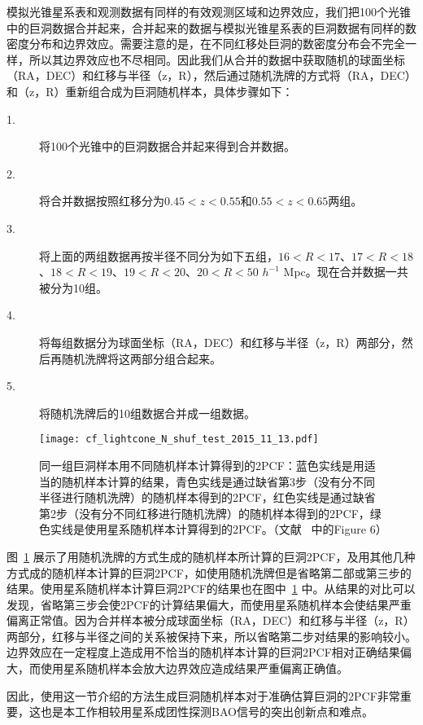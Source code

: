 {模拟光锥星系表和观测数据有同样的有效观测区域和边界效应，我们把100个光锥中的巨洞数据合并起来，合并起来的数据与模拟光锥星系表的巨洞数据有同样的数密度分布和边界效应。需要注意的是，在不同红移处巨洞的数密度分布会不完全一样，所以其边界效应也不尽相同。因此我们从合并的数据中获取随机的球面坐标（RA，DEC）和红移与半径（z，R），然后通过随机洗牌的方式将（RA，DEC）和（z，R）重新组合成为巨洞随机样本，具体步骤如下：
\begin{description}
\item[1.] 将100个光锥中的巨洞数据合并起来得到合并数据。
\item[2.] 将合并数据按照红移分为$0.45 < z < 0.55$和$0.55 < z < 0.65$两组。
\item[3.] 将上面的两组数据再按半径不同分为如下五组，$16<R<17$、$17<R<18$、$18<R<19$、$19<R<20$、$20<R<50$ $h^{-1}$ Mpc。现在合并数据一共被分为10组。
\item[4.] 将每组数据分为球面坐标（RA，DEC）和红移与半径（z，R）两部分，然后再随机洗牌将这两部分组合起来。
\item[5.] 将随机洗牌后的10组数据合并成一组数据。
\end{description}

\begin{figure}
\centering
\texttt{[image: cf\_lightcone\_N\_shuf\_test\_2015\_11\_13.pdf]}
\caption{同一组巨洞样本用不同随机样本计算得到的2PCF：蓝色实线是用适当的随机样本计算的结果，青色实线是通过缺省第3步（没有分不同半径进行随机洗牌）的随机样本得到的2PCF，红色实线是通过缺省第2步（没有分不同红移进行随机洗牌）的随机样本得到的2PCF，绿色实线是使用星系随机样本计算得到的2PCF。（文献 ~中的Figure 6）}
\label{fig:cf_lightcone_N_shuf_test}
\end{figure}

图~\ref{fig:cf_lightcone_N_shuf_test} 展示了用随机洗牌的方式生成的随机样本所计算的巨洞2PCF，及用其他几种方式成的随机样本计算的巨洞2PCF，如使用随机洗牌但是省略第二部或第三步的结果。使用星系随机样本计算巨洞2PCF的结果也在图中~\ref{fig:cf_lightcone_N_shuf_test} 中。从结果的对比可以发现，省略第三步会使2PCF的计算结果偏大，而使用星系随机样本会使结果严重偏离正常值。因为合并样本被分成球面坐标（RA，DEC）和红移与半径（z，R）两部分，红移与半径之间的关系被保持下来，所以省略第二步对结果的影响较小。边界效应在一定程度上造成用不恰当的随机样本计算的巨洞2PCF相对正确结果偏大，而使用星系随机样本会放大边界效应造成结果严重偏离正确值。

因此，使用这一节介绍的方法生成巨洞随机样本对于准确估算巨洞的2PCF非常重要，这也是本工作相较用星系成团性探测BAO信号的突出创新点和难点。

}
